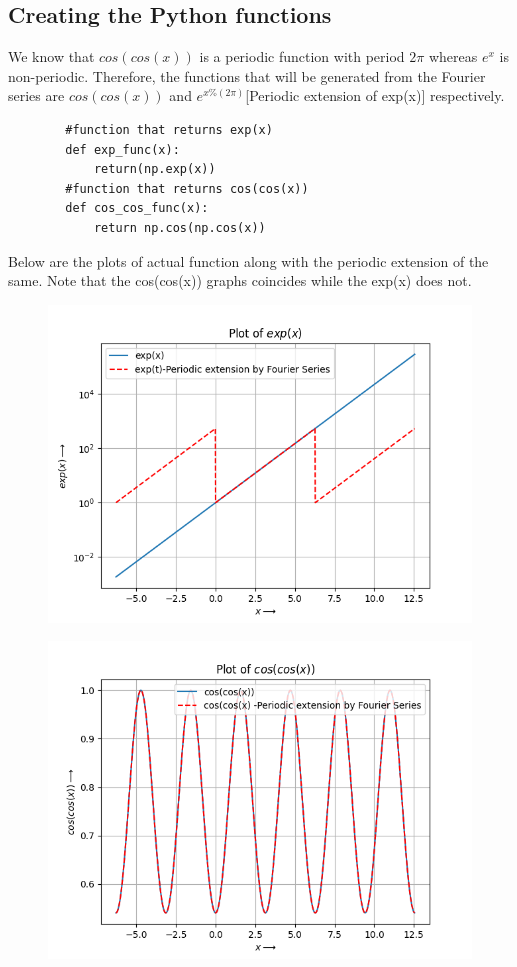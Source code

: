 \documentclass{article}
\begin{document}
\subsection{Creating the Python functions}
    We know that $cos(cos(x))$ is a periodic function with period $2\pi$ whereas $e^x$ is non-periodic. Therefore, the functions that will be generated from the Fourier series are $cos(cos(x))$ and $e^{x\%(2\pi)}$[Periodic extension of exp(x)] respectively.
    \lstset{language=Python}
    \lstset{basicstyle=\footnotesize}
    \begin{lstlisting}
        #function that returns exp(x)
        def exp_func(x):
            return(np.exp(x)) 
        #function that returns cos(cos(x))
        def cos_cos_func(x):
            return np.cos(np.cos(x))
    \end{lstlisting}
    Below are the plots of actual function along with the periodic extension of the same.
    Note that the cos(cos(x)) graphs coincides while the exp(x) does not. 
    \begin{figure}[h!]
    \centering
    \includegraphics[scale=0.8]{exp(x).png}
    \label{fig:1(a)}
    \end{figure}
    \begin{figure}[h!]
    \centering
    \includegraphics[scale=0.8]{coscosx.png}
    \label{fig:1(b)}
    \end{figure}
\newpage
\end{document}
